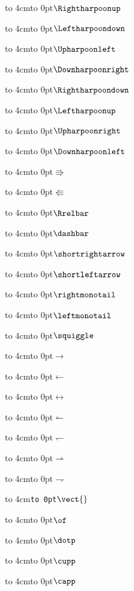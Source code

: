 


\parindent=0pt
\nopagenumbers
\parskip=10pt

\def\disp#1{{\tt\string#1}\hfil\hbox to 0pt{\hss$#1$\hss}}
\def\test#1{\leavevmode\hbox to 4cm{\disp#1}\par}

\test\Rightharpoonup
\test\Leftharpoondown
\test\Upharpoonleft
\test\Downharpoonright
\test\Rightharpoondown
\test\Leftharpoonup
\test\Upharpoonright
\test\Downharpoonleft
\test\Rrightarrow
\test\Lleftarrow
\test\Rrelbar
\test\dashbar
\test\shortrightarrow
\test\shortleftarrow
\test\rightmonotail
\test\leftmonotail
\test\squiggle
\test\rightarrow
\test\leftarrow
\test\leftrightarrow
\test\leftharpoonup
\test\leftharpoondown
\test\rightharpoonup
\test\rightharpoondown
{\def\disp#1{#1}%
 \leavevmode\test{{\tt \string\vect}\hfil\hbox to 0pt{\hss$\vect{ }$\hss}}
}%
\test\of
\test\dotp
\test\cupp
\test\capp

\bye
